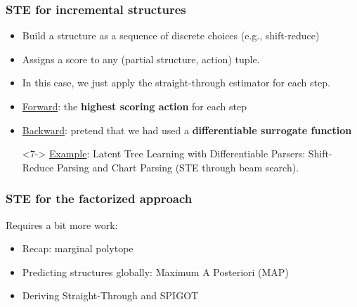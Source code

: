\begin{frame}%
\frametitle{STE for incremental structures}%
\centering
\begin{itemize}
    \item<2-> Build a structure as a sequence of discrete choices (e.g., shift-reduce)
    \item<3-> Assigns a score to any (partial structure, action) tuple.
    \item<4-> In this case, we just apply the straight-through estimator for each step.
    \item<5-> \underline{Forward}: the \textbf{highest scoring action} for each step
    \item<6-> \underline{Backward}: pretend that we had used a \textbf{differentiable surrogate function}
    \item[]<7-> \underline{Example}: Latent Tree Learning with Differentiable Parsers: Shift-Reduce Parsing and Chart Parsing \citep{maillard2018latent} (STE through beam search).
\end{itemize}
\end{frame}

\begin{frame}
\frametitle{STE for the factorized approach}
Requires a bit more work:
\begin{itemize}
\item Recap: marginal polytope
\item Predicting structures globally: Maximum A Posteriori (MAP)
\item Deriving Straight-Through and SPIGOT
\end{itemize}
\end{frame}


